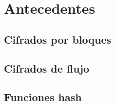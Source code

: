 %
%

\chapter{Antecedentes}



\section{Cifrados por bloques}

\section{Cifrados de flujo}



\section{Funciones hash}
